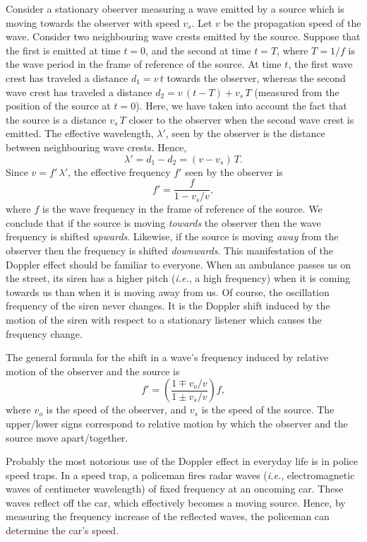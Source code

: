 Consider a stationary observer measuring a wave emitted by a source which is moving towards
the observer with speed $v_s$. Let $v$ be the propagation speed of the wave. 
Consider two neighbouring wave crests emitted by the source. Suppose that the first is
emitted at time $t=0$, and the second at time $t=T$, where $T=1/f$ is the wave period in the
frame of reference of the source. At time $t$, the first wave crest has traveled a distance
$d_1=v\,t$ towards the observer, whereas the second wave crest has traveled a distance
$d_2 =v\,(t-T) + v_s\,T$ (measured from the position of the
source at $t=0$). Here, we have taken into account the fact that the source is
a distance $v_s\,T$ closer to the observer when the second wave crest is emitted. 
The effective wavelength, $\lambda'$,  seen by the observer is the distance between neighbouring
wave crests. Hence,
\begin{equation}
\lambda' = d_1-d_2 = (v - v_s)\,T.
\end{equation}
 Since $v=f'\,\lambda'$,
the effective frequency $f'$ seen by the observer is
\begin{equation}
f' = \frac{f}{1-v_s/v},
\end{equation}
where $f$ is the wave frequency in the frame of reference of the source. We conclude that if the
source is moving {\em  towards} the observer then the wave frequency is shifted {\em upwards}. Likewise,
if the source is moving {\em away} from the observer then the frequency is shifted {\em downwards}.
This manifestation of the Doppler effect should be familiar to everyone. When an ambulance
passes us on the street, its siren has a higher pitch ({\em i.e.}, a high
frequency) when it is coming towards us than when it is moving away from us.
Of course, the oscillation frequency of the siren never changes. It is the Doppler
shift induced by the motion of the siren with respect to a stationary listener which
causes the frequency change.

The general formula for the shift in a wave's frequency induced by
relative motion of the observer and the source is
\begin{equation}
f' = \left(\frac{1\mp v_o/v}{1\pm v_s/v}\right) f,
\end{equation}
where $v_o$ is the speed of the observer, and $v_s$ is the speed of the source.
The upper/lower signs correspond to relative motion by which the observer and the source
move apart/together.

Probably the most notorious use of the Doppler effect in everyday life is in police speed
traps. In a speed trap, a policeman fires radar waves ({\em i.e.}, electromagnetic
waves of centimeter wavelength) of fixed frequency at an oncoming car. These waves
reflect off the car, which effectively becomes a moving source. Hence, by measuring the frequency increase
of the reflected waves, the policeman can determine the car's speed.

